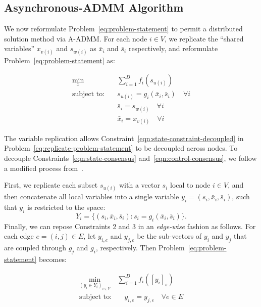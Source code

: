 
\subsection{Asynchronous-ADMM Algorithm} %
\label{sec:algorithm}

We now reformulate Problem~\eqref{eq:problem-statement} to permit a distributed solution method via A-ADMM.  For each node $i\in V$, we replicate the ``shared variables'' $x_{v\left(i\right)}$ and $s_{w\left(i\right)}$ as $\bar{x}_i$ and $\bar{s}_i$ respectively, and reformulate Problem~\eqref{eq:problem-statement} as:

\begin{align}
	\label{eq:replicate-problem-statement}
	\min_{x} & \quad \sum_{i = 1}^D f_i\left(s_{u\left(i\right)}\right) \\
	\text{subject to:} & \quad s_{u\left(i\right)} = g_i\left(\bar{x}_i, \bar{s}_i\right) \quad \forall i  \label{eqn:state-constraint-decoupled} \\
	 & \quad \bar{s}_i = s_{w\left(i\right)} \quad \forall i \label{eqn:state-consensus} \\
	 & \quad \bar{x}_i = x_{v\left(i\right)} \quad \forall i \label{eqn:control-consensus} 
\end{align}

The variable replication allows Constraint~\eqref{eqn:state-constraint-decoupled} in Problem~\eqref{eq:replicate-problem-statement} to be decoupled across nodes. To decouple Constraints~\eqref{eqn:state-consensus} and~\eqref{eqn:control-consensus}, we follow a modified process from~\cite{Wei2013On}.

First, we replicate each subset $s_{u\left(i\right)}$ with a vector $s_i$ local to node $i \in V$, and then concatenate all local variables into a single variable $y_i = \left(s_i, \bar{x}_i, \bar{s}_i\right)$, such that $y_i$ is restricted to the space:
\[
Y_i = \{\left(s_i,\bar{x}_i, \bar{s}_i\right) : s_i = g_i\left(\bar{x}_i, \bar{s}_i\right)\}.
\]
Finally, we can repose Constraints 2 and 3 in an \emph{edge-wise} fashion as follows. For each edge $e = \left(i,j\right) \in E$, let $y_{i,e}$ and $y_{j,e}$ be the sub-vectors of $y_i$ and $y_j$ that are coupled through $g_j$ and $g_i$, respectively. Then Problem~\eqref{eq:problem-statement} becomes:

\begin{align}
	\label{eq:edge-problem-statement}
	\min_{(y_i \in Y_i)_{i \in V}} & \sum_{i = 1}^D f_i\left(\left[y_i\right]_{s}\right) \\
	\text{subject to:} & \quad y_{i,e} = y_{j,e} \quad \forall e\in E
\end{align}

